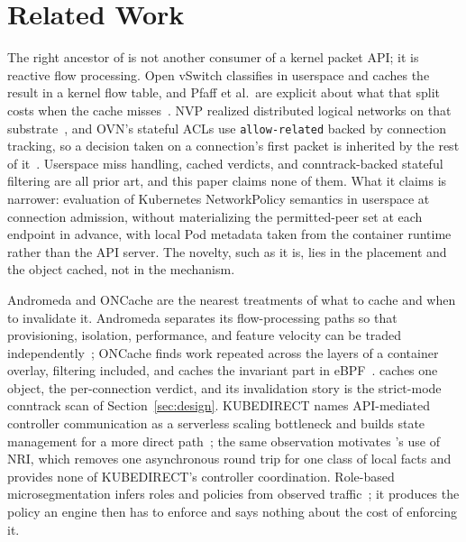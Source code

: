 \section{Related Work}
\label{sec:related}

The right ancestor of \sys{} is not another consumer of a kernel packet
API; it is reactive flow processing. Open vSwitch classifies in
userspace and caches the result in a kernel flow table, and Pfaff et
al.\ are explicit about what that split costs when the cache
misses~\cite{pfaff2015ovs}. NVP realized distributed logical networks
on that substrate~\cite{koponen2014nvp}, and OVN's stateful ACLs use
\texttt{allow-related} backed by connection tracking, so a decision
taken on a connection's first packet is inherited by the rest of
it~\cite{ovnacl}. Userspace miss handling, cached verdicts, and
conntrack-backed stateful filtering are all prior art, and this paper
claims none of them. What it claims is narrower: evaluation of
Kubernetes NetworkPolicy semantics in userspace at connection
admission, without materializing the permitted-peer set at each
endpoint in advance, with local Pod metadata taken from the container
runtime rather than the API server. The novelty, such as it is, lies in
the placement and the object cached, not in the mechanism.

Andromeda and ONCache are the nearest treatments of what to cache and
when to invalidate it. Andromeda separates its flow-processing paths so
that provisioning, isolation, performance, and feature velocity can be
traded independently~\cite{dalton2018andromeda}; ONCache finds work
repeated across the layers of a container overlay, filtering included,
and caches the invariant part in eBPF~\cite{oncache2025}. \sys{} caches
one object, the per-connection verdict, and its invalidation story is
the strict-mode conntrack scan of Section~\ref{sec:design}. KUBEDIRECT
names API-mediated controller communication as a serverless scaling
bottleneck and builds state management for a more direct
path~\cite{kubedirect2026}; the same observation motivates \sys{}'s use
of NRI, which removes one asynchronous round trip for one class of
local facts and provides none of KUBEDIRECT's controller coordination.
Role-based microsegmentation infers roles and policies from observed
traffic~\cite{mani2025microsegmentation}; it produces the policy an
engine then has to enforce and says nothing about the cost of enforcing
it.


